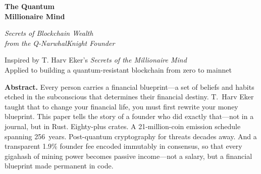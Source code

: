\documentclass[11pt,a4paper]{article}
\begin{document}
\begin{titlepage}
\centering
\vspace*{1.5cm}


\vspace{0.8cm}

{\Huge\bfseries\color{qnkblue} The Quantum\\[0.3cm]
Millionaire Mind\\[0.5cm]}

{\LARGE\color{wealthgold!80!black}\itshape
Secrets of Blockchain Wealth\\
from the Q-NarwhalKnight Founder\\[0.8cm]}


\vspace{0.6cm}

{\large\color{gray}
Inspired by T. Harv Eker's \emph{Secrets of the Millionaire Mind}\\[0.3cm]
Applied to building a quantum-resistant blockchain from zero to mainnet\\[1cm]}

\begin{tcolorbox}[
    colback=qnkblue!5,
    colframe=qnkblue!60,
    width=0.85\textwidth,
    arc=6pt,
    boxrule=1pt,
    left=12pt,
    right=12pt,
    top=10pt,
    bottom=10pt,
]
\small
\textbf{Abstract.}
Every person carries a financial blueprint---a set of beliefs and habits
etched in the subconscious that determines their financial destiny.
T.~Harv Eker taught that to change your financial life, you must first
rewrite your money blueprint. This paper tells the story of a founder
who did exactly that---not in a journal, but in Rust. Eighty-plus
crates. A 21-million-coin emission schedule spanning 256~years.
Post-quantum cryptography for threats decades away. And a transparent
1.9\% founder fee encoded immutably in consensus, so that every
gigahash of mining power becomes passive income---not a salary,
but a financial blueprint made permanent in code.


\end{tcolorbox}
\end{titlepage}
\end{document}
